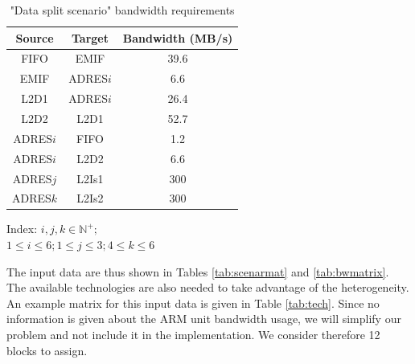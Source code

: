 \begin{table}[h!]
\caption{"Data split scenario" bandwidth requirements}
\begin{center}
\begin{scriptsize}
\begin{tabular}{|c|c|c|}
\hline Source & Target & Bandwidth (MB/s)\\
\hline FIFO & EMIF & 39.6\\
EMIF & ADRES$i$ & 6.6\\
L2D1 & ADRES$i$ & 26.4\\
L2D2 & L2D1 & 52.7\\
ADRES$i$ & FIFO & 1.2\\
ADRES$i$ & L2D2 & 6.6\\
ADRES$j$ & L2Is1 & 300\\
ADRES$k$ & L2Is2 & 300\\
\hline
\end{tabular}
\end{scriptsize}
\end{center}
\begin{center}
Index: $i, j, k \in \mathbb{N}^{+};$\\
$1 \leq i \leq 6; 1\leq j \leq 3; 4 \leq k \leq 6$
\end{center}
\label{tab:3mfbw}
\end{table}

The input data are thus shown in Tables \ref{tab:scenarmat} and \ref{tab:bwmatrix}. The available technologies are also needed to take advantage of the heterogeneity. An example matrix for this input data is given in Table \ref{tab:tech}. Since no information is given about the ARM unit bandwidth usage, we will simplify our problem and not include it in the implementation. We consider therefore 12 blocks to assign.

